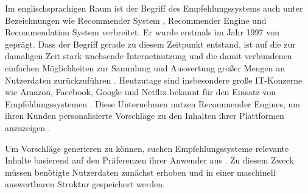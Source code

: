 Im englischsprachigen Raum ist der Begriff des Empfehlungssystems auch unter Bezeichnungen wie Recommender System \cite[S. 1]{lu:2015}, Recommender Engine \cite[S. 1]{panigrahi:2016} und Recommendation System \cite[S. 1]{ebesu:2018} verbreitet. Er wurde erstmals im Jahr 1997 von \textcite[S. 1]{resnick:1997} geprägt. Dass der Begriff gerade zu diesem Zeitpunkt entstand, ist auf die zur damaligen Zeit stark wachsende Internetnutzung und die damit verbundenen einfachen Möglichkeiten zur Sammlung und Auswertung großer Mengen an Nutzerdaten zurückzuführen \cite[S. xvii]{recommenderSystems:2016}. Heutzutage sind insbesondere große IT-Konzerne wie Amazon, Facebook, Google und Netflix bekannt für den Einsatz von Empfehlungssystemen \cite[S. 1]{zarzour:2018}. Diese Unternehmen nutzen Recommender Engines, um ihren Kunden personalisierte Vorschläge zu den Inhalten ihrer Plattformen anzuzeigen \cite[S. 2]{jeckmans:2013}.

Um Vorschläge generieren zu können, suchen Empfehlungssysteme relevante Inhalte basierend auf den Präferenzen ihrer Anwender aus \cite[S. 1]{das:2017}. Zu diesem Zweck müssen benötigte Nutzerdaten zunächst erhoben und in einer maschinell auswertbaren Struktur gespeichert werden.

